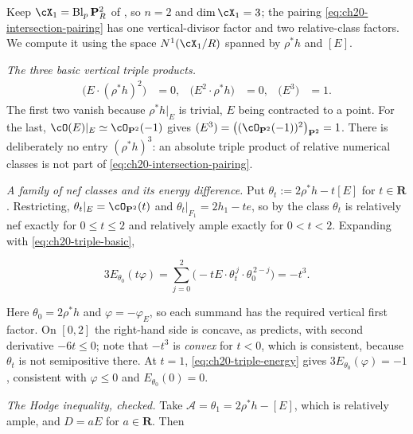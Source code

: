 \begin{example}
\label{ex:ch20-triple-products}
Keep \(\cX_1=\operatorname{Bl}_p\mathbf P^2_R\) of
, so \(n=2\) and \(\dim\cX_1=3\); the
pairing \eqref{eq:ch20-intersection-pairing} has one vertical-divisor factor
and two relative-class factors.  We compute it using the space
\(N^1(\cX_1/R)\) spanned by \(\rho^*h\) and \([E]\).

\emph{The three basic vertical triple products.}
\begin{align}
\label{eq:ch20-triple-basic}
 \bigl(E\cdot(\rho^*h)^2\bigr)&=0, &
 \bigl(E^2\cdot\rho^*h\bigr)&=0, &
 \bigl(E^3\bigr)&=1 .
\end{align}
The first two vanish because \(\rho^*h|_E\) is trivial, \(E\) being
contracted to a point.  For the last,
\(\cO(E)|_E\simeq\cO_{\mathbf P^2}(-1)\) gives
\((E^3)=\bigl((\cO_{\mathbf P^2}(-1))^2\bigr)_{\mathbf P^2}=1\).
There is deliberately no entry \((\rho^*h)^3\): an absolute triple product
of relative numerical classes is not part of
\eqref{eq:ch20-intersection-pairing}.

\emph{A family of nef classes and its energy difference.}  Put
\(\theta_t:=2\rho^*h-t[E]\) for \(t\in\mathbf R\).  Restricting,
\(\theta_t|_E=\cO_{\mathbf P^2}(t)\) and
\(\theta_t|_{F_1}=2h_1-te\), so by
 the class \(\theta_t\) is relatively nef
exactly for \(0\leq t\leq2\) and relatively ample exactly for
\(0<t<2\).  Expanding with \eqref{eq:ch20-triple-basic},

\begin{equation}
\label{eq:ch20-triple-energy}
 3E_{\theta_0}(t\varphi)
 =\sum_{j=0}^2\bigl(-tE\cdot\theta_t^{\,j}\cdot
                      \theta_0^{\,2-j}\bigr)
 =-t^3 .
\end{equation}

Here \(\theta_0=2\rho^*h\) and \(\varphi=-\varphi_E\), so each summand has
the required vertical first factor.  On \([0,2]\) the right-hand side is
concave, as  predicts, with second derivative
\(-6t\leq0\); note that \(-t^3\) is \emph{convex} for \(t<0\), which is
consistent, because \(\theta_t\) is not semipositive there.  At \(t=1\),
\eqref{eq:ch20-triple-energy} gives
\(3E_{\theta_0}(\varphi)=-1\), consistent with \(\varphi\leq0\) and
\(E_{\theta_0}(0)=0\).

\emph{The Hodge inequality, checked.}  Take \(\mathcal A=\theta_1=2\rho^*h-[E]\),
which is relatively ample, and \(D=aE\) for \(a\in\mathbf R\).  Then


\end{example}
